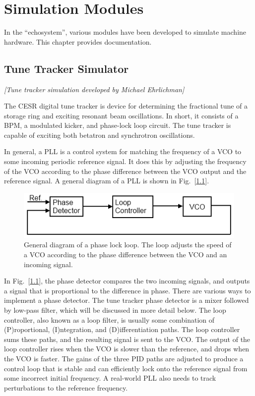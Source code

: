 \chapter{Simulation Modules}

In the \bmad ``echosystem'', various modules have been developed to
simulate machine hardware. This chapter provides documentation.

\section{Tune Tracker Simulator}

\textit{\large [Tune tracker simulation developed by Michael Ehrlichman]}

The CESR digital tune tracker is device for determining the fractional tune of a storage ring and exciting
resonant beam oscillations.  In short, it consists of a BPM, a modulated kicker, and phase-lock loop circuit.
The tune tracker is capable of exciting both betatron
and synchrotron oscillations.

In general, a PLL is a control system for matching the frequency of a VCO to some incoming periodic
reference signal.  It does this by adjusting the frequency of the VCO according to the phase 
difference between the VCO output and the reference signal.  A general diagram of a PLL is shown
in Fig.~[\ref{fig:PLL}].

\begin{figure}[h]
\centering
\includegraphics{PLL.png}
\caption{General diagram of a phase lock loop.  The loop adjusts the speed of a VCO according to the 
phase difference between the VCO and an incoming signal.}
\label{fig:PLL}
\end{figure}

In Fig.~[\ref{fig:PLL}], the phase detector compares the two incoming signals, and outputs a signal
that is proportional to the difference in phase.  There are various ways to implement a phase
detector.  The tune tracker phase detector is a mixer followed by low-pass filter, which will be discussed in more detail below.
The loop controller, also known as a loop filter, is usually some combination of (P)roportional, (I)ntegration, 
and (D)ifferentiation paths.  The loop controller sums these paths, and the resulting signal is sent to the VCO.
The output of the loop controller rises when the VCO is slower than the 
reference, and drops when the VCO is faster.  The gains of the three PID paths are adjusted to produce
a control loop that is stable and can efficiently lock onto the reference signal 
from some incorrect initial frequency.  A real-world PLL also needs to track 
perturbations to the reference frequency.

